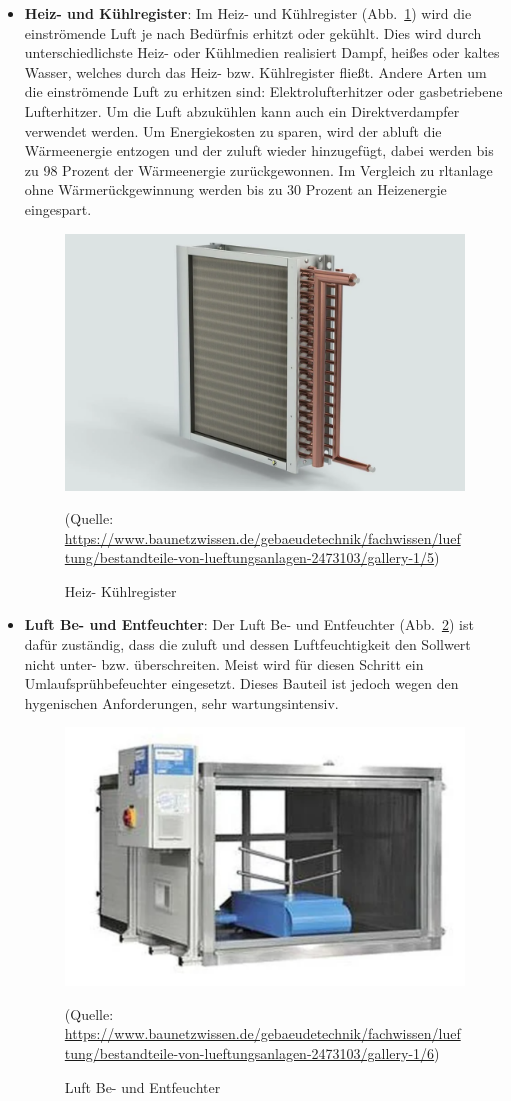 \begin{itemize}
	\item \textbf{Heiz- und Kühlregister}: Im Heiz- und Kühlregister (Abb.~\ref{fig:heizregister}) wird die einströmende Luft je nach Bedürfnis erhitzt oder gekühlt. Dies wird durch unterschiedlichste Heiz- oder Kühlmedien realisiert \zB Dampf, heißes oder kaltes Wasser, welches durch das Heiz- bzw. Kühlregister fließt. Andere Arten um die einströmende Luft zu erhitzen sind: Elektrolufterhitzer oder gasbetriebene Lufterhitzer. Um die Luft abzukühlen kann auch ein Direktverdampfer verwendet werden.
	Um Energiekosten zu sparen, wird der \gls{abluft} die Wärmeenergie entzogen und der \gls{zuluft} wieder hinzugefügt, dabei werden bis zu 98 Prozent der Wärmeenergie zurückgewonnen. Im Vergleich zu \ac{rltanlage} ohne Wärmerückgewinnung werden bis zu 30 Prozent an Heizenergie eingespart. 

\begin{figure}[H]
	\centering
	\includegraphics[width=0.6\linewidth]{Bilder/luftwaermeregister}
	\caption{Heiz- Kühlregister} 
	(Quelle: \url{https://www.baunetzwissen.de/gebaeudetechnik/fachwissen/lueftung/bestandteile-von-lueftungsanlagen-2473103/gallery-1/5})
	\label{fig:heizregister}
\end{figure}

	\item \textbf{Luft Be- und Entfeuchter}: Der Luft Be- und Entfeuchter (Abb.~\ref{fig:luftbefeuchter}) ist dafür zuständig, dass die \gls{zuluft} und dessen Luftfeuchtigkeit den Sollwert nicht unter- bzw. überschreiten. Meist wird für diesen Schritt ein Umlaufsprühbefeuchter eingesetzt. Dieses Bauteil ist jedoch wegen den hygenischen Anforderungen, sehr wartungsintensiv. 

\begin{figure}[H]
	\centering
	\includegraphics[width=0.4\linewidth]{Bilder/Luftbefeuchter}
	\caption{Luft Be- und Entfeuchter} 
	(Quelle: \url{	https://www.baunetzwissen.de/gebaeudetechnik/fachwissen/lueftung/bestandteile-von-lueftungsanlagen-2473103/gallery-1/6})
	\label{fig:luftbefeuchter}
\end{figure}


\end{itemize}
